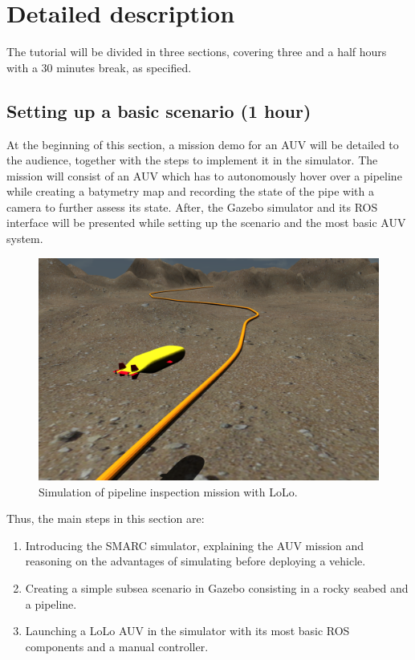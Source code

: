 \documentclass[
10pt, %
a4paper, %
oneside, %
headinclude,footinclude, %
BCOR5mm, %
]{scrartcl}
\title{\normalfont{Tutorial outline}} %
\date{} %
\begin{document}
\maketitle %

\section{Detailed description}
\label{sec:draft}
The tutorial will be divided in three sections, covering three and a half hours with a 30 minutes break, as specified. 

\subsection{\textbf{Setting up a basic scenario (1 hour)}}
At the beginning of this section, a mission demo for an AUV will be detailed to the audience, together with the steps to implement it in the simulator.
The mission will consist of an AUV which has to autonomously hover over a pipeline while creating a batymetry map and recording the state of the pipe with a camera to further assess its state.
After, the Gazebo simulator and its ROS interface will be presented while setting up the scenario and the most basic AUV system.

\begin{figure}[h]
    \centering
    \includegraphics[width=0.9\linewidth]{Figures/sim_pipeline.png}
    \caption{Simulation of pipeline inspection mission with LoLo.}
\label{fig:lolo_gazebo}
\end{figure}

Thus, the main steps in this section are:
\begin{enumerate}
	\item Introducing the SMARC simulator, explaining the AUV mission and reasoning on the advantages of simulating before deploying a vehicle.
	\item Creating a simple subsea scenario in Gazebo consisting in a rocky seabed and a pipeline.
	\item Launching a LoLo AUV in the simulator with its most basic ROS components and a manual controller.
\end{enumerate}
\end{document}
